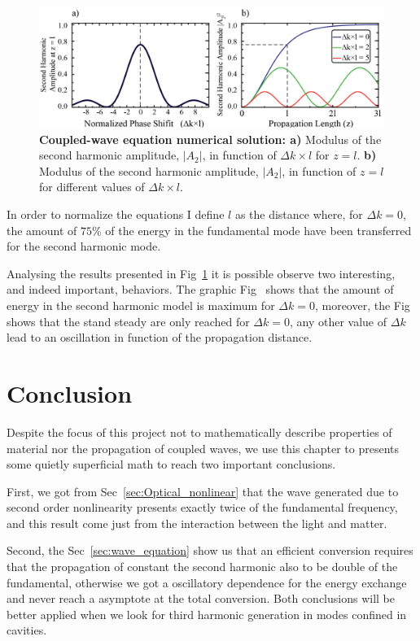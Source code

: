 \begin{figure}[h!]
    \centering
    \includegraphics[width = 16cm]{figuras/Dissertation_coppled_eq_sol.jpg}
    \caption{\textbf{Coupled-wave equation numerical solution: a)} Modulus of the second harmonic amplitude, $|A_2|$, in function of $\Delta k \times l$ for $z = l$. \textbf{b)} Modulus of the second harmonic amplitude, $|A_2|$, in function of $z = l$ for different values of $\Delta k \times l$.}
    \label{fig:model_solution}
\end{figure}

In order to normalize the equations I define $l$ as the distance where, for $\Delta k = 0$, the amount of $75\%$ of the energy in the fundamental mode have been transferred for the second harmonic mode. 

Analysing the results presented in Fig~\ref{fig:model_solution} it is possible observe two interesting, and indeed important, behaviors. The graphic Fig~ shows that the amount of energy in the second harmonic model is maximum for $\Delta k = 0$, moreover, the Fig~ shows that the stand steady are only reached for $\Delta k = 0$, any other value of $\Delta k$ lead to an oscillation in function of the propagation distance.

\section{Conclusion}
Despite the focus of this project not to mathematically describe properties of material nor the propagation of coupled waves, we use this chapter to presents some quietly superficial math to reach two important conclusions.

First, we got from Sec~\ref{sec:Optical_nonlinear} that the wave generated due to second order nonlinearity presents exactly twice of the fundamental frequency, and this result come just from the interaction between the light and matter. 

Second, the Sec~\ref{sec:wave_equation} show us that an efficient conversion requires that the propagation of constant the second harmonic also to be double of the fundamental, otherwise we got a oscillatory dependence for the energy exchange and never reach a asymptote at the total conversion. 
% 
%
%
Both conclusions will be better applied when we look for third harmonic generation in  modes confined in cavities. 

